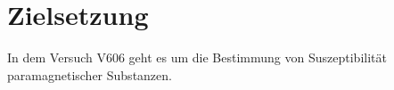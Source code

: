 \section{Zielsetzung} 

\begin{flushleft}
    In dem Versuch V606 geht es um die Bestimmung von Suszeptibilität paramagnetischer Substanzen.
\end{flushleft}


